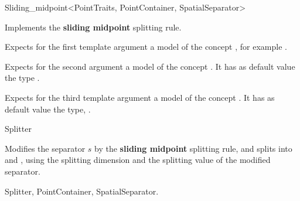 

\begin{ccRefFunctionObjectClass}{Sliding_midpoint<PointTraits, PointContainer, SpatialSeparator>}


\ccDefinition
Implements the {\bf sliding midpoint} splitting rule.


\ccParameters

Expects for the first template argument a model of
the concept , 
for example . 

Expects for the second argument a model of the concept . It has as default value
the type .

Expects for the third template argument a model of the concept . It has as default value
the type, .


\ccIsModel

Splitter

\ccTypes



\ccOperations

{Modifies the separator $s$ by the {\bf sliding midpoint} splitting rule, 
and splits  into  and ,
using the splitting dimension and the splitting value of the modified separator.
}

\ccSeeAlso

Splitter, PointContainer, SpatialSeparator.
\end{ccRefFunctionObjectClass}


